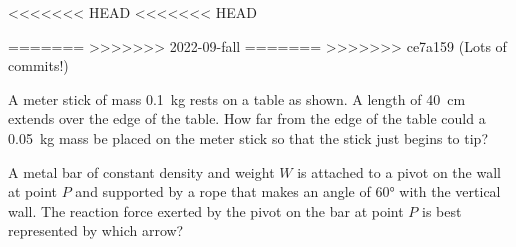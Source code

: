 \documentclass{../../oss-apphys-exam}
\begin{document}
\genheader


<<<<<<< HEAD
<<<<<<< HEAD
\genmultidirections

\gengravity
=======
>>>>>>> 2022-09-fall
=======
>>>>>>> ce7a159 (Lots of commits!)

\raggedcolumns
\begin{multicols*}{2}
  \begin{questions}

    \question A meter stick of mass \SI{.1}{\kilo\gram} rests on a table as
    shown. A length of \SI{40}{\centi\metre} extends over the edge of the table.
    How far from the edge of the table could a \SI{.05}{\kilo\gram} mass be
    placed on the meter stick so that the stick just begins to tip?
    \begin{center}
    \end{center}
    
    \question A metal bar of constant density and weight $W$ is attached to a
    pivot on the wall at point $P$ and supported by a rope that makes an angle
    of \ang{60} with the vertical wall. The reaction force exerted by the pivot
    on the bar at point $P$ is best represented by which arrow?
    \begin{choices}
      \choice{\Huge$\nearrow$}
      \choice{\Huge$\uparrow$}
      \choice{\Huge$\downarrow$}
      \choice{\Huge$\nwarrow$}
      \choice{\Huge$\searrow$}
    \end{choices}
    \columnbreak
    

\end{questions}
\end{multicols*}
\end{document}
